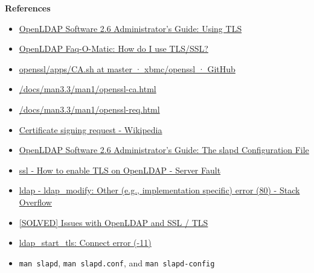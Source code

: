 \documentclass[12pt, a4paper]{article}
\begin{document}
  \textbf{References}
  \begin{itemize}
    \item \href{https://www.openldap.org/doc/admin26/tls.html}{OpenLDAP Software 2.6 Administrator's Guide: Using TLS}
    \item \href{https://www.openldap.org/faq/data/cache/185.html}{OpenLDAP Faq-O-Matic: How do I use TLS/SSL?}
    \item \href{https://github.com/xbmc/openssl/blob/master/apps/CA.sh}{openssl/apps/CA.sh at master · xbmc/openssl · GitHub}
    \item \href{https://www.openssl.org/docs/man3.3/man1/openssl-ca.html}{/docs/man3.3/man1/openssl-ca.html}
    \item \href{https://www.openssl.org/docs/man3.3/man1/openssl-req.html}{/docs/man3.3/man1/openssl-req.html}
    \item \href{https://en.wikipedia.org/wiki/Certificate_signing_request}{Certificate signing request - Wikipedia}
    \item \href{https://www.openldap.org/doc/admin26/slapdconfig.html}{OpenLDAP Software 2.6 Administrator's Guide: The slapd Configuration File}
    \item \href{https://serverfault.com/questions/539226/how-to-enable-tls-on-openldap}{ssl - How to enable TLS on OpenLDAP - Server Fault}
    \item \href{https://stackoverflow.com/questions/51745010/ldap-modify-other-e-g-implementation-specific-error-80}{ldap - ldap\_modify: Other (e.g., implementation specific) error (80) - Stack Overflow}
    \item \href{https://www.linuxquestions.org/questions/linux-software-2/issues-with-openldap-and-ssl-tls-905840/}{[SOLVED] Issues with OpenLDAP and SSL / TLS}
    \item \href{https://www.linuxquestions.org/questions/linux-networking-3/ldap_start_tls-connect-error-11-a-497888/}{ldap\_start\_tls: Connect error (-11)}
    \item \verb|man slapd|, \verb|man slapd.conf|, and \verb|man slapd-config|
  \end{itemize}

  \pagebreak
\end{document}
